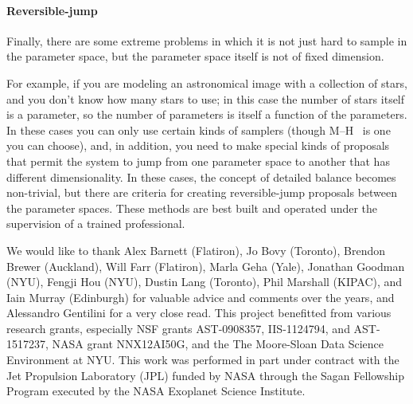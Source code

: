 \documentclass[modern]{aastex61}
\newcommand{\MCMC}{\acronym{MCMC}}
\begin{document}
\paragraph{Reversible-jump}
Finally, there are some extreme problems in which it is not just hard
to sample in the parameter space, but the parameter space itself is
not of fixed dimension.

For example, if you are modeling an astronomical image with a
collection of stars, and you don't know how many stars to use; in this
case the number of stars itself is a parameter, so the number of
parameters is itself a function of the parameters.
In these cases you can only use certain kinds of samplers (though M--H
\MCMC\ is one you can choose), and, in addition, you need to make
special kinds of proposals that permit the system to jump from one
parameter space to another that has different dimensionality.
In these cases, the concept of detailed balance becomes non-trivial,
but there are criteria for creating reversible-jump proposals between
the parameter spaces.
These methods are best built and operated under the supervision of a
trained professional.

\acknowledgements
We would like to thank
          Alex Barnett (Flatiron),
          Jo Bovy (Toronto),
          Brendon Brewer (Auckland),
          Will Farr (Flatiron),
          Marla Geha (Yale),
          Jonathan Goodman (NYU),
          Fengji Hou (NYU),
          Dustin Lang (Toronto),
          Phil Marshall (KIPAC), and
          Iain Murray (Edinburgh)
        for valuable advice and comments over the years, and
          Alessandro Gentilini
        for a very close read.
        This project benefitted from various research grants, especially
          NSF grants AST-0908357, IIS-1124794, and AST-1517237,
          NASA grant NNX12AI50G,
          and the The Moore-Sloan Data Science Environment at NYU.
This work was performed in part under contract with the Jet Propulsion
Laboratory (JPL) funded by NASA through the Sagan Fellowship Program executed
by the NASA Exoplanet Science Institute.
\end{document}
